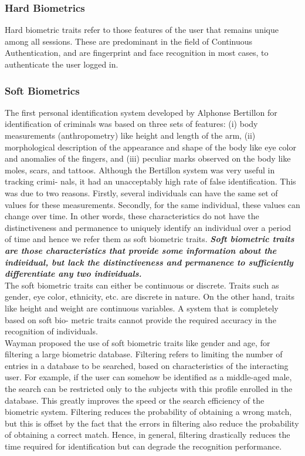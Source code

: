 \documentclass[12pt]{article}			%
\begin{document}
\subsubsection{ Hard Biometrics}
Hard biometric traits refer to those features of the user that remains unique among all sessions. These are predominant in the field of
Continuous Authentication, and are fingerprint and face recognition in most cases, to authenticate the user logged in. 

\subsubsection{ Soft Biometrics }
The first personal identification system developed by Alphonse Bertillon\cite{bert96} for identification of criminals was based
on three sets of features: (i) body measurements (anthropometry) like height and length of the arm, (ii) morphological
description of the appearance and shape of the body like eye color and anomalies of the fingers, and (iii) peculiar marks
observed on the body like moles, scars, and tattoos. Although the Bertillon system was very useful in tracking crimi-
nals, it had an unacceptably high rate of false identification. This was due to two reasons. Firstly, several individuals
can have the same set of values for these measurements. Secondly, for the same individual, these values can change
over time. In other words, these characteristics do not have the distinctiveness and permanence to uniquely identify
an individual over a period of time and hence we refer them as soft biometric traits. {\bf \it Soft biometric traits are those
characteristics that provide some information about the individual, but lack the distinctiveness and permanence to
sufficiently differentiate any two individuals.}\cite{Jain204}\\
The soft biometric traits can either be continuous or discrete. Traits such as gender, eye color, ethnicity, etc. are discrete in nature. On
the other hand, traits like height and weight are continuous variables. A system that is completely based on soft bio-
metric traits cannot provide the required accuracy in the recognition of individuals.\\
Wayman\cite{way97} proposed the use of soft biometric traits like gender and age, for filtering a large biometric database.
Filtering refers to limiting the number of entries in a database to be searched, based on characteristics of the interacting
user. For example, if the user can somehow be identified as a middle-aged male, the search can be restricted only to
the subjects with this profile enrolled in the database. This greatly improves the speed or the search efficiency of
the biometric system. Filtering reduces the probability of obtaining a wrong match, but this is offset by the fact that
the errors in filtering also reduce the probability of obtaining a correct match. Hence, in general, filtering drastically
reduces the time required for identification but can degrade the recognition performance.
\end{document}

